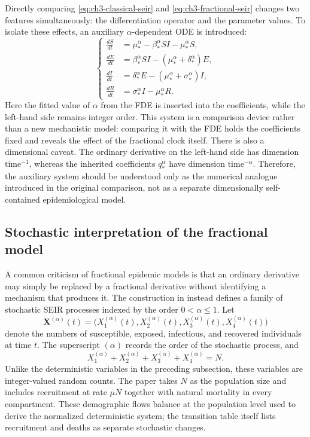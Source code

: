 \documentclass[00-main.tex]{subfiles}
\begin{document}
Directly comparing \eqref{eq:ch3-classical-seir} and \eqref{eq:ch3-fractional-seir} changes two features simultaneously: the differentiation operator and the parameter values.
To isolate these effects, an auxiliary $\alpha$-dependent ODE is introduced:
\begin{equation}
\label{eq:ch3-alpha-ode}
\left\{
\begin{aligned}
\frac{dS}{dt} &= \mu_*^{\alpha}-\beta_*^{\alpha}SI-\mu_*^{\alpha}S,\\[3pt]
\frac{dE}{dt} &= \beta_*^{\alpha}SI-(\mu_*^{\alpha}+\delta_*^{\alpha})E,\\[3pt]
\frac{dI}{dt} &= \delta_*^{\alpha}E-(\mu_*^{\alpha}+\sigma_*^{\alpha})I,\\[3pt]
\frac{dR}{dt} &= \sigma_*^{\alpha}I-\mu_*^{\alpha}R.
\end{aligned}
\right.
\end{equation}
Here the fitted value of $\alpha$ from the FDE is inserted into the coefficients, while the left-hand side remains integer order.
This system is a comparison device rather than a new mechanistic model: comparing it with the FDE holds the coefficients fixed and reveals the effect of the fractional clock itself.
There is also a dimensional caveat.
The ordinary derivative on the left-hand side has dimension $\mathrm{time}^{-1}$, whereas the inherited coefficients $q_*^{\alpha}$ have dimension $\mathrm{time}^{-\alpha}$.
Therefore, the auxiliary system should be understood only as the numerical analogue introduced in the original comparison, not as a separate dimensionally self-contained epidemiological model.


\subsection{Stochastic interpretation of the fractional model}

A common criticism of fractional epidemic models is that an ordinary derivative may simply be replaced by a fractional derivative without identifying a mechanism that produces it.
The construction in \cite{Is20} instead defines a family of stochastic SEIR processes indexed by the order $0<\alpha\leq1$.
Let
\[
\boldsymbol{X}^{(\alpha)}(t)
=\bigl(X_1^{(\alpha)}(t),X_2^{(\alpha)}(t),X_3^{(\alpha)}(t),X_4^{(\alpha)}(t)\bigr)
\]
denote the numbers of susceptible, exposed, infectious, and recovered individuals at time $t$.
The superscript $(\alpha)$ records the order of the stochastic process, and
\[
X_1^{(\alpha)}+X_2^{(\alpha)}+X_3^{(\alpha)}+X_4^{(\alpha)}=N.
\]
Unlike the deterministic variables in the preceding subsection, these variables are integer-valued random counts.
The paper takes $N$ as the population size and includes recruitment at rate $\mu N$ together with natural mortality in every compartment.
These demographic flows balance at the population level used to derive the normalized deterministic system; the transition table itself lists recruitment and deaths as separate stochastic changes.
\end{document}
